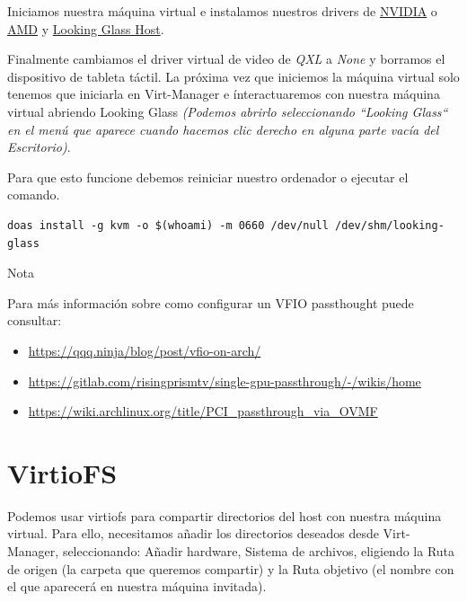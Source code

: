 \documentclass[11pt]{article}
\begin{document}
Iniciamos nuestra máquina virtual e instalamos nuestros drivers de \href{https://www.nvidia.es/Download/index.aspx?lang=es}{NVIDIA} o \href{https://www.amd.com/es/support}{AMD} y \href{https://looking-glass.io/downloads}{Looking Glass Host}.

\vspace{5pt}

Finalmente cambiamos el driver virtual de video de \textit{QXL} a \textit{None} y borramos el dispositivo de tableta táctil. La próxima vez que iniciemos la máquina virtual solo tenemos que iniciarla en Virt-Manager e ínteractuaremos con nuestra máquina virtual abriendo Looking Glass \textit{(Podemos abrirlo seleccionando ``Looking Glass`` en el menú que aparece cuando hacemos clic derecho en alguna parte vacía del Escritorio)}.

\clearpage

\noindent Para que esto funcione debemos reiniciar nuestro ordenador o ejecutar el comando.

\begin{verbatim}
doas install -g kvm -o $(whoami) -m 0660 /dev/null /dev/shm/looking-glass
\end{verbatim}

\begin{mybox}{Nota}

Para más información sobre como configurar un VFIO passthought puede consultar:

\vspace{-7.5pt}

\begin{itemize}
\setlength\itemsep{-0.3em}
\item \href{https://qqq.ninja/blog/post/vfio-on-arch/}
{https://qqq.ninja/blog/post/vfio-on-arch/}
\item \href{https://gitlab.com/risingprismtv/single-gpu-passthrough/-/wikis/home}
{https://gitlab.com/risingprismtv/single-gpu-passthrough/-/wikis/home}
\item \href{https://wiki.archlinux.org/title/PCI\_passthrough\_via\_OVMF}
{https://wiki.archlinux.org/title/PCI\_passthrough\_via\_OVMF}
\end{itemize}
\end{mybox}

\section{VirtioFS}

Podemos usar virtiofs para compartir directorios del host con nuestra máquina virtual. Para ello, necesitamos añadir los directorios deseados desde Virt-Manager, seleccionando: Añadir hardware, Sistema de archivos, eligiendo la Ruta de origen (la carpeta que queremos compartir) y la Ruta objetivo (el nombre con el que aparecerá en nuestra máquina invitada).
\end{document}
